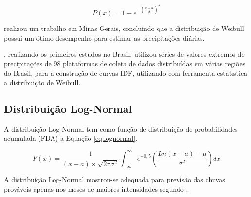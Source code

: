 \begin{equation}
\label{eq:weibull}
    P(x) = 1 - e^{-(\frac{x-\alpha}{\beta})^\lambda}
\end{equation}

 realizou um trabalho em Minas Gerais, concluindo que a distribuição de Weibull possui um ótimo desempenho para estimar as precipitações diárias.

, realizando os primeiros estudos no Brasil, utilizou séries de valores extremos de precipitações de 98 plataformas de coleta de dados distribuídas em várias regiões do Brasil, para a construção de curvas IDF, utilizando com ferramenta estatística a distribuição de Weibull.

\subsection{Distribuição Log-Normal}

A distribuição Log-Normal tem como função de distribuição de probabilidades acumulada (FDA) a Equação \ref{eq:lognormal}.

\begin{equation}
\label{eq:lognormal}
    P(x) = \frac{1}{(x-a) \times \sqrt{2\pi\sigma^2}} \int_{-\infty}^{\infty} e^{-0,5} \left( \frac{Ln(x-a)-\mu}{\sigma^2} \right) dx
\end{equation}

A distribuição Log-Normal mostrou-se adequada para previsão das chuvas prováveis apenas nos meses de maiores intensidades segundo .